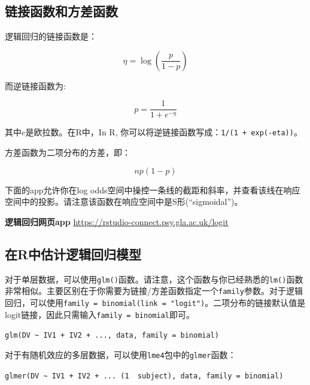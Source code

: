 \documentclass[
]{book}
\begin{document}
\hypertarget{ux94feux63a5ux51fdux6570ux548cux65b9ux5deeux51fdux6570}{%
\subsection{链接函数和方差函数}\label{ux94feux63a5ux51fdux6570ux548cux65b9ux5deeux51fdux6570}}

逻辑回归的链接函数是：

\[\eta = \log \left(\frac{p}{1-p}\right)\]

而逆链接函数为:

\[p = \frac{1}{1 + e^{-\eta}}\]

其中\(e\)是欧拉数。在R中，In R, 你可以将逆链接函数写成：\texttt{1/(1\ +\ exp(-eta))}。

方差函数为二项分布的方差，即：

\[np(1 - p)\]

下面的app允许你在log odds空间中操控一条线的截距和斜率，并查看该线在响应空间中的投影。请注意该函数在响应空间中是S形(``sigmoidal'')。

\label{fig:logit-app}\textbf{逻辑回归网页app} \url{https://rstudio-connect.psy.gla.ac.uk/logit}

\hypertarget{ux5728rux4e2dux4f30ux8ba1ux903bux8f91ux56deux5f52ux6a21ux578b}{%
\subsection{在R中估计逻辑回归模型}\label{ux5728rux4e2dux4f30ux8ba1ux903bux8f91ux56deux5f52ux6a21ux578b}}

对于单层数据，可以使用\texttt{glm()}函数。请注意，这个函数与你已经熟悉的\texttt{lm()}函数非常相似。主要区别在于你需要为链接/方差函数指定一个\texttt{family}参数。对于逻辑回归，可以使用\texttt{family\ =\ binomial(link\ =\ "logit")}。二项分布的链接默认值是logit链接，因此只需输入\texttt{family\ =\ binomial}即可。

\texttt{glm(DV\ \textasciitilde{}\ IV1\ +\ IV2\ +\ ...,\ data,\ family\ =\ binomial)}

对于有随机效应的多层数据，可以使用\texttt{lme4}包中的\texttt{glmer}函数：

\texttt{glmer(DV\ \textasciitilde{}\ IV1\ +\ IV2\ +\ ...\ (1\ \textbar{}\ subject),\ data,\ family\ =\ binomial)}

  
\end{document}
